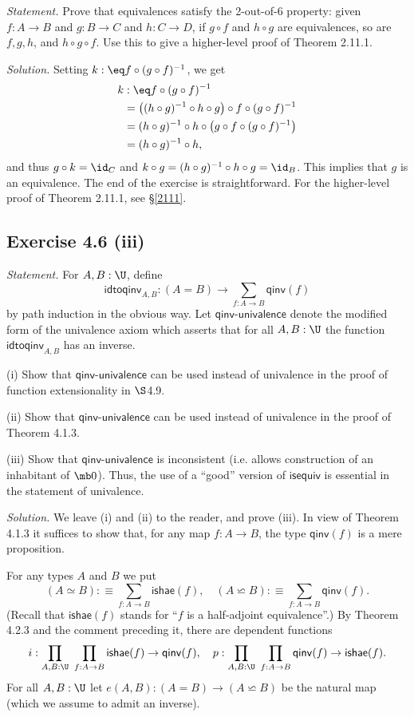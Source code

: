 \documentclass[12pt]{article}
\begin{document}
\emph{Statement.} Prove that equivalences satisfy the 2-out-of-6 property: given $f:A\to B$ and $g:B\to C$ and $h:C\to D$, if $g\circ f$ and $h\circ g$ are equivalences, so are $f,g,h$, and $h\circ g\circ f$. Use this to give a higher-level proof of Theorem 2.11.1.

\nn\emph{Solution.} Setting $k:\eq f\circ (g\circ f)^{-1}$, we get 
\begin{align*}
k&:\eq f\circ (g\circ f)^{-1}\\
&=\big((h\circ g)^{-1}\circ h\circ g\big)\circ f\circ (g\circ f)^{-1}\\
&=(h\circ g)^{-1}\circ h\circ\big(g\circ f\circ (g\circ f)^{-1}\big)\\
&=(h\circ g)^{-1}\circ h,
\end{align*}
and thus $g\circ k=\id_C$ and $k\circ g=(h\circ g)^{-1}\circ h\circ g=\id_B$. This implies that $g$ is an equivalence. The end of the exercise is straightforward. For the higher-level proof of Theorem 2.11.1, see \S\ref{2111}.


\subsection{Exercise 4.6 (iii)}

\emph{Statement.} For $A,B:\U$, define
$$
\mathsf{idtoqinv}_{A,B}:(A=B)\to\sum_{f:A\to B}\mathsf{qinv}(f)
$$
by path induction in the obvious way. Let $\mathsf{qinv}$-$\mathsf{univalence}$ denote the modified form of the univalence axiom which asserts that for all $A,B:\U$ the function $\mathsf{idtoqinv}_{A,B}$ has an inverse.

\nn(i) Show that $\mathsf{qinv}$-$\mathsf{univalence}$ can be used instead of univalence in the proof of function extensionality in $\S$4.9.

\nn(ii) Show that $\mathsf{qinv}$-$\mathsf{univalence}$ can be used instead of univalence in the proof of Theorem 4.1.3.

\nn(iii) Show that $\mathsf{qinv}$-$\mathsf{univalence}$ is inconsistent (i.e. allows construction of an inhabitant of $\mb0$). Thus, the use of a ``good'' version of $\mathsf{isequiv}$ is essential in the statement of univalence.

\nn\emph{Solution.} We leave (i) and (ii) to the reader, and prove (iii). In view of Theorem 4.1.3 it suffices to show that, for any map $f:A\to B$, the type $\mathsf{qinv}(f)$ is a mere proposition. 

For any types $A$ and $B$ we put 
$$
(A\simeq B):\equiv\sum_{f:A\to B}\mathsf{ishae}(f),\quad(A\backsimeq B):\equiv\sum_{f:A\to B}\mathsf{qinv}(f).
$$ 
(Recall that $\mathsf{ishae}(f)$ stands for ``$f$ is a half-adjoint equivalence''.) By Theorem 4.2.3 and the comment preceding it, there are dependent functions 
$$
i:\prod_{A,B:\U}\ \prod_{f:A\to B}\mathsf{ishae}(f)\to\mathsf{qinv}(f),\quad p:\prod_{A,B:\U}\ \prod_{f:A\to B}\mathsf{qinv}(f)\to\mathsf{ishae}(f).
$$ 
For all $A,B:\U$ let $e(A,B):(A=B)\to(A\backsimeq B)$ be the natural map (which we assume to admit an inverse).
\end{document}
